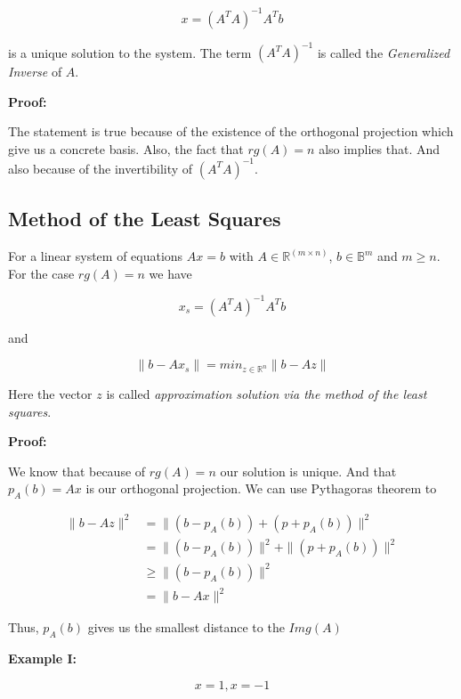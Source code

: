 \[
x = {(A^T A)}^{-1} A^T b
\]

is a unique solution to the system. The term \({(A^T A)}^{-1}\) is called the \emph{Generalized Inverse} of \(A\).
\vspace{\baselineskip}

\textbf{Proof:}

The statement is true because of the existence of the orthogonal projection which give us a concrete basis. Also, 
the fact that \(rg(A) = n\) also implies that. And also because of the invertibility of \({(A^T A)}^{-1}\).

\QED

\subsection{Method of the Least Squares}

For a linear system of equations \(Ax=b\) with \(A \in \mathbb{R}^{(m \times n)}\), 
\(b \in \mathbb{B}^m\) and \(m \ge n\). For the case \(rg(A) = n\) we have

\[
x_s = {(A^T A)}^{-1} A^T b
\]

and 

\[
\| b - Ax_s \| = min_{z \in \mathbb{R}^n} \| b - Az \| 
\]

Here the vector \(z\) is called \emph{approximation solution via the method of the least squares}.
\vspace{\baselineskip}

\textbf{Proof:}

We know that because of \(rg(A) = n\) our solution is unique. And that \(p_A(b) = Ax\) is our orthogonal 
projection. We can use Pythagoras theorem to


\begin{align*}
\| b - Az \|^2 &= \| (b  - p_A (b))  + (p + p_A(b)) \|^2 \\
			   &=  \| (b  - p_A (b))\|^2  +\|(p + p_A(b)) \|^2 \\
  			   &\ge  \| (b  - p_A (b))\|^2 \\
			   &= \| b - Ax \|^2 
\end{align*}

Thus, \(p_A(b)\) gives us the smallest distance to the \(Img(A)\)

\QED
\vspace{\baselineskip}

\textbf{Example I:}
\vspace{\baselineskip}

\[
x = 1, x = -1
\]

